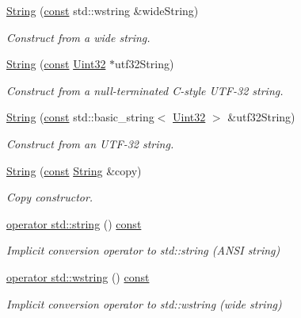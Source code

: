 \begin{DoxyCompactItemize}
\hyperlink{classsf_1_1_string_a5e38151340af4f9a5f74ad24c0664074}{String} (\hyperlink{term__entry_8h_a57bd63ce7f9a353488880e3de6692d5a}{const} std\-::wstring \&wide\-String)
\begin{DoxyCompactList}\small\item\em Construct from a wide string. \end{DoxyCompactList}\item 
\hyperlink{classsf_1_1_string_aea3629adf19f9fe713d4946f6c75b214}{String} (\hyperlink{term__entry_8h_a57bd63ce7f9a353488880e3de6692d5a}{const} \hyperlink{namespacesf_aa746fb1ddef4410bddf198ebb27e727c}{Uint32} $\ast$utf32\-String)
\begin{DoxyCompactList}\small\item\em Construct from a null-\/terminated C-\/style U\-T\-F-\/32 string. \end{DoxyCompactList}\item 
\hyperlink{classsf_1_1_string_a6eee86dbe75d16bbcc26e97416c2e1ca}{String} (\hyperlink{term__entry_8h_a57bd63ce7f9a353488880e3de6692d5a}{const} std\-::basic\-\_\-string$<$ \hyperlink{namespacesf_aa746fb1ddef4410bddf198ebb27e727c}{Uint32} $>$ \&utf32\-String)
\begin{DoxyCompactList}\small\item\em Construct from an U\-T\-F-\/32 string. \end{DoxyCompactList}\item 
\hyperlink{classsf_1_1_string_af862594d3c4070d8ddbf08cf8dce4f59}{String} (\hyperlink{term__entry_8h_a57bd63ce7f9a353488880e3de6692d5a}{const} \hyperlink{classsf_1_1_string}{String} \&copy)
\begin{DoxyCompactList}\small\item\em Copy constructor. \end{DoxyCompactList}\item 
\hyperlink{classsf_1_1_string_a3664f92c3b488bf9f60f6b8eafe1844d}{operator std\-::string} () \hyperlink{term__entry_8h_a57bd63ce7f9a353488880e3de6692d5a}{const} 
\begin{DoxyCompactList}\small\item\em Implicit conversion operator to std\-::string (A\-N\-S\-I string) \end{DoxyCompactList}\item 
\hyperlink{classsf_1_1_string_a20d50d45020d1dbe1779dda69ee83732}{operator std\-::wstring} () \hyperlink{term__entry_8h_a57bd63ce7f9a353488880e3de6692d5a}{const} 
\begin{DoxyCompactList}\small\item\em Implicit conversion operator to std\-::wstring (wide string) \end{DoxyCompactList}\item 

\end{DoxyCompactItemize}

